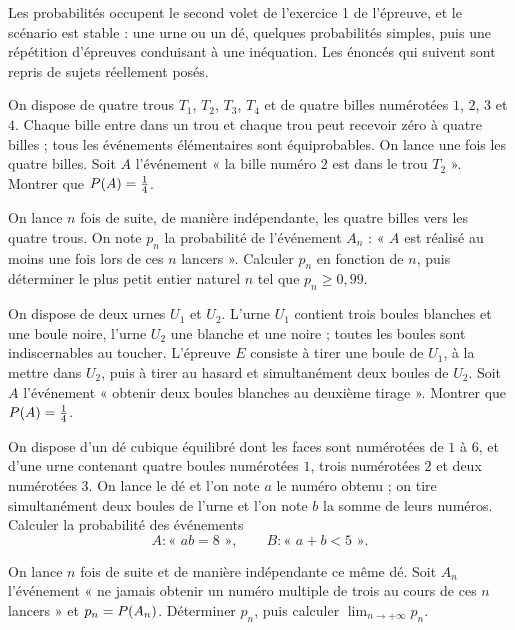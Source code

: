 \begin{annales}
Les probabilités occupent le second volet de l'exercice 1 de l'épreuve, et le
scénario est stable : une urne ou un dé, quelques probabilités simples, puis
une répétition d'épreuves conduisant à une inéquation. Les énoncés qui suivent
sont repris de sujets réellement posés.

On dispose de quatre trous $T_{1}$, $T_{2}$, $T_{3}$, $T_{4}$ et de quatre
billes numérotées $1$, $2$, $3$ et $4$. Chaque bille entre dans un trou et
chaque trou peut recevoir zéro à quatre billes ; tous les événements
élémentaires sont équiprobables. On lance une fois les quatre billes. Soit $A$
l'événement « la bille numéro $2$ est dans le trou $T_{2}$ ». Montrer que
$P\!\left(A\right) = \frac14$.

On lance $n$ fois de suite, de manière indépendante, les quatre billes vers
les quatre trous. On note $p_{n}$ la probabilité de l'événement $A_{n}$ :
« $A$ est réalisé au moins une fois lors de ces $n$ lancers ». Calculer
$p_{n}$ en fonction de $n$, puis déterminer le plus petit entier naturel $n$
tel que $p_{n} \geq 0{,}99$.

On dispose de deux urnes $U_{1}$ et $U_{2}$. L'urne $U_{1}$ contient trois
boules blanches et une boule noire, l'urne $U_{2}$ une blanche et une noire ;
toutes les boules sont indiscernables au toucher. L'épreuve $E$ consiste à
tirer une boule de $U_{1}$, à la mettre dans $U_{2}$, puis à tirer au hasard et
simultanément deux boules de $U_{2}$. Soit $A$ l'événement « obtenir deux
boules blanches au deuxième tirage ». Montrer que
$P\!\left(A\right) = \frac14$.

On dispose d'un dé cubique équilibré dont les faces sont numérotées de $1$ à
$6$, et d'une urne contenant quatre boules numérotées $1$, trois numérotées
$2$ et deux numérotées $3$. On lance le dé et l'on note $a$ le numéro obtenu ;
on tire simultanément deux boules de l'urne et l'on note $b$ la somme de leurs
numéros. Calculer la probabilité des événements
\[
  A : \text{« } ab = 8 \text{ »}, \qquad
  B : \text{« } a+b<5 \text{ »} .
\]

On lance $n$ fois de suite et de manière indépendante ce même dé. Soit
$A_{n}$ l'événement « ne jamais obtenir un numéro multiple de trois au cours
de ces $n$ lancers » et $p_{n} = P\!\left(A_{n}\right)$. Déterminer $p_{n}$, puis
calculer $\lim_{n\to+\infty}p_{n}$.


\end{annales}
